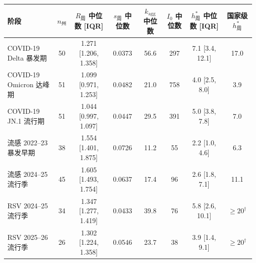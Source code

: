 \begin{tabular}{lccccccc}
\toprule
阶段 & $n_{\text{州}}$ & $R_{\text{周}}$ 中位数 [IQR] & $s_{\text{周}}$ 中位数 & $k_{\text{agg}}$ 中位数 & $I_0$ 中位数 & $h^*_{\text{周}}$ 中位数 [IQR] & 国家级 $h^*_{\text{周}}$ \\
\midrule
COVID-19 Delta 暴发期 & 50 & 1.271 [1.206, 1.358] & 0.0373 & 56.6 & 297 & 7.1 [3.4, 12.1] & 17.0 \\
COVID-19 Omicron 达峰期 & 51 & 1.099 [0.971, 1.253] & 0.0482 & 21.0 & 758 & 4.0 [2.5, 8.0] & 3.9 \\
COVID-19 JN.1 流行期 & 51 & 1.044 [0.997, 1.097] & 0.0447 & 29.5 & 391 & 5.0 [3.8, 7.8] & 7.0 \\
流感 2022--23 暴发早期 & 38 & 1.554 [1.401, 1.875] & 0.0726 & 11.2 & 55 & 2.2 [1.0, 4.6] & 6.3 \\
流感 2024--25 流行季 & 45 & 1.605 [1.493, 1.754] & 0.0637 & 17.4 & 96 & 2.6 [1.8, 7.1] & 11.1 \\
RSV 2024--25 流行季 & 34 & 1.347 [1.277, 1.419] & 0.0433 & 39.8 & 76 & 5.8 [2.6, 10.1] & $\ge 20^{\dagger}$ \\
RSV 2025--26 流行季 & 26 & 1.302 [1.224, 1.358] & 0.0546 & 23.7 & 38 & 3.9 [1.4, 9.1] & $\ge 20^{\dagger}$ \\
\bottomrule
\end{tabular}
